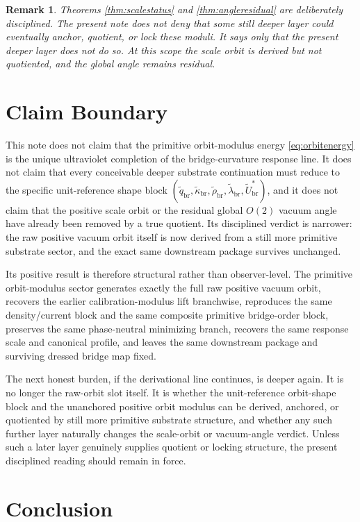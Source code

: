 \documentclass[11pt]{article}
\newcommand{\RespShapeReadout}{\widetilde q_{\mathrm{br}}}
\newcommand{\RespShapeCov}{\widetilde\kappa_{\mathrm{br}}}
\newcommand{\RespShapeRelax}{\widetilde\rho_{\mathrm{br}}}
\newcommand{\RespShapeWell}{\widetilde\lambda_{\mathrm{br}}}
\newcommand{\RespShapeEq}{\widetilde U_{\mathrm{br}}^{\ast}}
\newtheorem{remark}{Remark}
\begin{document}
\begin{remark}
Theorems \ref{thm:scalestatus} and \ref{thm:angleresidual} are deliberately disciplined. The present note does not deny that some still deeper layer could eventually anchor, quotient, or lock these moduli. It says only that the present deeper layer does not do so. At this scope the scale orbit is derived but not quotiented, and the global angle remains residual.
\end{remark}

\section{Claim Boundary}

This note does not claim that the primitive orbit-modulus energy \eqref{eq:orbitenergy} is the unique ultraviolet completion of the bridge-curvature response line. It does not claim that every conceivable deeper substrate continuation must reduce to the specific unit-reference shape block \((\RespShapeReadout,\RespShapeCov,\RespShapeRelax,\RespShapeWell,\RespShapeEq)\), and it does not claim that the positive scale orbit or the residual global \(O(2)\) vacuum angle have already been removed by a true quotient. Its disciplined verdict is narrower: the raw positive vacuum orbit itself is now derived from a still more primitive substrate sector, and the exact same downstream package survives unchanged.

Its positive result is therefore structural rather than observer-level. The primitive orbit-modulus sector generates exactly the full raw positive vacuum orbit, recovers the earlier calibration-modulus lift branchwise, reproduces the same density/current block and the same composite primitive bridge-order block, preserves the same phase-neutral minimizing branch, recovers the same response scale and canonical profile, and leaves the same downstream package and surviving dressed bridge map fixed.

The next honest burden, if the derivational line continues, is deeper again. It is no longer the raw-orbit slot itself. It is whether the unit-reference orbit-shape block and the unanchored positive orbit modulus can be derived, anchored, or quotiented by still more primitive substrate structure, and whether any such further layer naturally changes the scale-orbit or vacuum-angle verdict. Unless such a later layer genuinely supplies quotient or locking structure, the present disciplined reading should remain in force.

\section{Conclusion}
\end{document}

